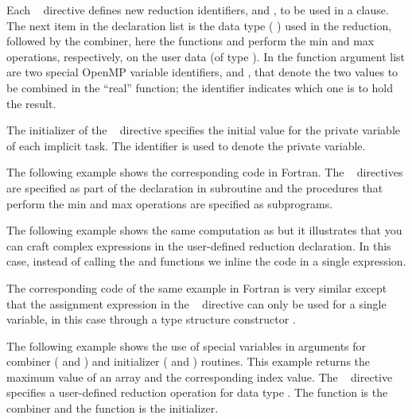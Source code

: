 Each ~ directive defines new reduction identifiers,
 and , to be used in a  clause. The next item in the
declaration list is the data type ( ) used in the reduction,
followed by the combiner, here the functions  and  perform
the min and max operations, respectively, on the user data (of type  ).
In the function argument list are two special OpenMP variable identifiers,  and ,
that denote the two values to be combined in the ``real'' function;
the  identifier indicates which one is to hold the result.

The initializer of the ~ directive specifies
the initial value for the private variable of each implicit task.
The  identifier is used to denote the private variable.


The following example shows the corresponding code in Fortran. 
The ~ directives are specified as part of 
the declaration in subroutine  and 
the procedures that perform the min and max operations are specified as subprograms.



The following example shows the same computation as  but it illustrates that you can craft complex expressions in the user-defined reduction declaration. In this case, instead of calling the  and  functions we inline the code in a single expression.


The corresponding code of the same example in Fortran is very similar
except that the assignment expression in the ~
directive can only be used for a single variable, in this case through
a type structure constructor .



The following example shows the use of special variables in arguments for combiner ( and ) and initializer ( and ) routines.  This example returns the maximum value of an array and the corresponding index value. The ~ directive specifies a user-defined reduction operation  for data type  . The function  is the combiner and the function  is the initializer.

